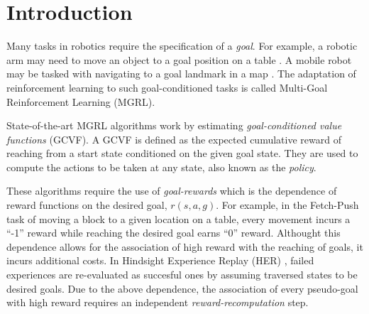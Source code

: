 \section{Introduction}

Many tasks in robotics require the specification of a \emph{goal}. For
example, a robotic arm may need to move an object to a goal position on
a table \citep{gu2017deep}. A mobile robot may be tasked with navigating
to a goal landmark in a map \citep{zhu2017target}.  The adaptation of
reinforcement learning to such goal-conditioned tasks is called
Multi-Goal Reinforcement Learning (MGRL)\citep{plappert2018multi}. 

State-of-the-art MGRL algorithms
\citep{andrychowicz2017hindsight, pong2018temporal}
work by estimating \emph{goal-conditioned value functions} (GCVF). A
GCVF is defined as the expected cumulative reward of reaching from a
start state conditioned on the given goal state. They are used to compute the
actions to be taken at any state, also known as the \emph{policy}.

These algorithms require the use of \emph{goal-rewards} which is the
dependence of reward functions on the desired goal, $r(s,a,g)$.
For example, in the Fetch-Push task \citep{plappert2018multi} of moving
a block to a given location on a table, every movement incurs a ``-1''
reward while reaching the desired goal earns ``0'' reward. Althought
this dependence allows for the association of high reward with the
reaching of goals, it incurs additional costs. In Hindsight Experience
Replay (HER) \citep{andrychowicz2017hindsight}, failed experiences are
re-evaluated as succesful ones by assuming traversed states to be
desired goals. Due to the above dependence, the association of every
pseudo-goal with high reward requires an independent
\emph{reward-recomputation} step. 


